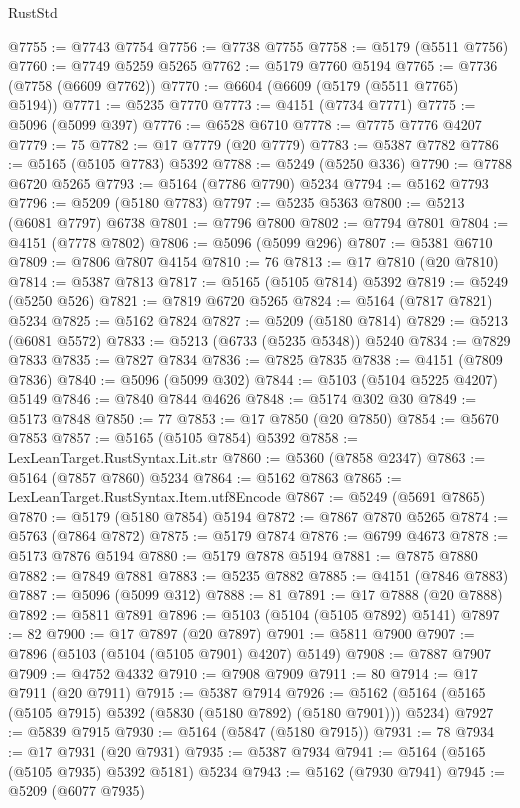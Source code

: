\begin{lexlean}{RustStd}
\begin{coremodule}
@7755 := @7743 @7754
@7756 := @7738 @7755
@7758 := @5179 (@5511 @7756)
@7760 := @7749 @5259 @5265
@7762 := @5179 @7760 @5194
@7765 := @7736 (@7758 (@6609 @7762))
@7770 := @6604 (@6609 (@5179 (@5511 @7765) @5194))
@7771 := @5235 @7770
@7773 := @4151 (@7734 @7771)
@7775 := @5096 (@5099 @397)
@7776 := @6528 @6710
@7778 := @7775 @7776 @4207
@7779 := 75
@7782 := @17 @7779 (@20 @7779)
@7783 := @5387 @7782
@7786 := @5165 (@5105 @7783) @5392
@7788 := @5249 (@5250 @336)
@7790 := @7788 @6720 @5265
@7793 := @5164 (@7786 @7790) @5234
@7794 := @5162 @7793
@7796 := @5209 (@5180 @7783)
@7797 := @5235 @5363
@7800 := @5213 (@6081 @7797) @6738
@7801 := @7796 @7800
@7802 := @7794 @7801
@7804 := @4151 (@7778 @7802)
@7806 := @5096 (@5099 @296)
@7807 := @5381 @6710
@7809 := @7806 @7807 @4154
@7810 := 76
@7813 := @17 @7810 (@20 @7810)
@7814 := @5387 @7813
@7817 := @5165 (@5105 @7814) @5392
@7819 := @5249 (@5250 @526)
@7821 := @7819 @6720 @5265
@7824 := @5164 (@7817 @7821) @5234
@7825 := @5162 @7824
@7827 := @5209 (@5180 @7814)
@7829 := @5213 (@6081 @5572)
@7833 := @5213 (@6733 (@5235 @5348)) @5240
@7834 := @7829 @7833
@7835 := @7827 @7834
@7836 := @7825 @7835
@7838 := @4151 (@7809 @7836)
@7840 := @5096 (@5099 @302)
@7844 := @5103 (@5104 @5225 @4207) @5149
@7846 := @7840 @7844 @4626
@7848 := @5174 @302 @30
@7849 := @5173 @7848
@7850 := 77
@7853 := @17 @7850 (@20 @7850)
@7854 := @5670 @7853
@7857 := @5165 (@5105 @7854) @5392
@7858 := LexLeanTarget.RustSyntax.Lit.str
@7860 := @5360 (@7858 @2347)
@7863 := @5164 (@7857 @7860) @5234
@7864 := @5162 @7863
@7865 := LexLeanTarget.RustSyntax.Item.utf8Encode
@7867 := @5249 (@5691 @7865)
@7870 := @5179 (@5180 @7854) @5194
@7872 := @7867 @7870 @5265
@7874 := @5763 (@7864 @7872)
@7875 := @5179 @7874
@7876 := @6799 @4673
@7878 := @5173 @7876 @5194
@7880 := @5179 @7878 @5194
@7881 := @7875 @7880
@7882 := @7849 @7881
@7883 := @5235 @7882
@7885 := @4151 (@7846 @7883)
@7887 := @5096 (@5099 @312)
@7888 := 81
@7891 := @17 @7888 (@20 @7888)
@7892 := @5811 @7891
@7896 := @5103 (@5104 (@5105 @7892) @5141)
@7897 := 82
@7900 := @17 @7897 (@20 @7897)
@7901 := @5811 @7900
@7907 := @7896 (@5103 (@5104 (@5105 @7901) @4207) @5149)
@7908 := @7887 @7907
@7909 := @4752 @4332
@7910 := @7908 @7909
@7911 := 80
@7914 := @17 @7911 (@20 @7911)
@7915 := @5387 @7914
@7926 := @5162 (@5164 (@5165 (@5105 @7915) @5392 (@5830 (@5180 @7892) (@5180 @7901))) @5234)
@7927 := @5839 @7915
@7930 := @5164 (@5847 (@5180 @7915))
@7931 := 78
@7934 := @17 @7931 (@20 @7931)
@7935 := @5387 @7934
@7941 := @5164 (@5165 (@5105 @7935) @5392 @5181) @5234
@7943 := @5162 (@7930 @7941)
@7945 := @5209 (@6077 @7935)

\end{coremodule}
\end{lexlean}
